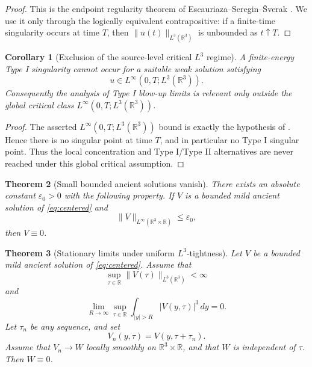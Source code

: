 \documentclass[11pt]{amsart}
\theoremstyle{plain}
\newtheorem{theorem}{Theorem}[section]
\newtheorem{corollary}[theorem]{Corollary}
\theoremstyle{definition}
\theoremstyle{remark}
\numberwithin{equation}{section}
\begin{document}
\begin{proof}
This is the endpoint regularity theorem of Escauriaza--Seregin--\v{S}verak
\cite{ESS2003}.  We use it only through the logically equivalent
contrapositive: if a finite-time singularity occurs at time \(T\), then
\(\|u(t)\|_{L^3(\mathbb R^3)}\) is unbounded as \(t\uparrow T\).
\end{proof}

\begin{corollary}[Exclusion of the source-level critical \(L^3\) regime]
\label{cor:source-L3-branch}
A finite-energy Type I singularity cannot occur for a suitable weak solution
satisfying
\[
   u\in L^\infty(0,T;L^3(\mathbb R^3)).
\]
Consequently the analysis of Type I blow-up limits is relevant only outside
the global critical class \(L^\infty(0,T;L^3(\mathbb R^3))\).
\end{corollary}

\begin{proof}
The asserted \(L^\infty(0,T;L^3(\mathbb R^3))\) bound is exactly the hypothesis of
.  Hence there is no singular point at time \(T\), and in
particular no Type I singular point.  Thus the local concentration and
Type I/Type II alternatives are never reached under this global critical
assumption.
\end{proof}

\begin{theorem}[Small bounded ancient solutions vanish]\label{thm:small}
There exists an absolute constant \(\varepsilon_0>0\) with the following property.  If
\(V\) is a bounded mild ancient solution of \eqref{eq:centered} and
\[
   \|V\|_{L^\infty(\mathbb R^3\times\mathbb R)}\le \varepsilon_0,
\]
then \(V\equiv0\).
\end{theorem}

\begin{theorem}[Stationary limits under uniform \(L^3\)-tightness]\label{thm:stationary-limits}
Let \(V\) be a bounded mild ancient solution of \eqref{eq:centered}.  Assume
that
\begin{equation}\label{eq:L3-bound-tight}
   \sup_{\tau\in\mathbb R}\|V(\tau)\|_{L^3(\mathbb R^3)}<\infty
\end{equation}
and
\begin{equation}\label{eq:tightness}
   \lim_{R\to\infty}
   \sup_{\tau\in\mathbb R}
   \int_{|y|>R}|V(y,\tau)|^3\,dy=0.
\end{equation}
Let \(\tau_n\) be any sequence, and set
\[
   V_n(y,\tau)=V(y,\tau+\tau_n).
\]
Assume that \(V_n\to W\) locally smoothly on \(\mathbb R^3\times\mathbb R\), and that
\(W\) is independent of \(\tau\).  Then \(W\equiv0\).
\end{theorem}
\end{document}
